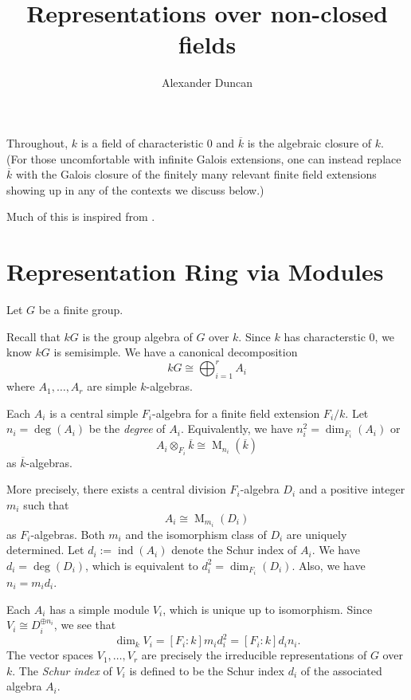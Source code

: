 \documentclass[12pt]{article}
\theoremstyle{plain}
\theoremstyle{definition}
\theoremstyle{remark}
\numberwithin{equation}{section}
\begin{document}
\title{Representations over non-closed fields}
\author{Alexander Duncan}

\maketitle

Throughout, $k$ is a field of characteristic $0$
and $\overline{k}$ is the algebraic closure of $k$.
(For those uncomfortable with infinite Galois extensions,
one can instead replace $\overline{k}$ with the Galois closure
of the finitely many relevant finite field extensions
showing up in any of the contexts we discuss below.)

Much of this is inspired from \cite[\S{12--13}]{Serre}.

\section{Representation Ring via Modules}

Let $G$ be a finite group.

Recall that $kG$ is the group algebra of $G$ over $k$.
Since $k$ has characterstic $0$, we know $kG$ is semisimple.
We have a canonical decomposition
\[
kG \cong \bigoplus_{i=1}^r A_i
\]
where $A_1,\ldots,A_r$ are simple $k$-algebras.

Each $A_i$ is a central simple $F_i$-algebra
for a finite field extension $F_i/k$.
Let $n_i = \deg(A_i)$ be the \emph{degree} of $A_i$.
Equivalently, we have $n_i^2 = \dim_{F_i}(A_i)$
or
\[
A_i \otimes_{F_i} \overline{k} \cong
\operatorname{M}_{n_i}(\overline{k})
\]
as $\overline{k}$-algebras.

More precisely, there exists a central division $F_i$-algebra $D_i$
and a positive integer $m_i$ such that
\[
A_i \cong \operatorname{M}_{m_i}(D_i)
\]
as $F_i$-algebras.
Both $m_i$ and the isomorphism class of $D_i$ are uniquely determined.
Let $d_i := \operatorname{ind}(A_i)$ denote the Schur index of $A_i$.
We have $d_i = \deg(D_i)$, which is equivalent to
$d_i^2=\dim_{F_i}(D_i)$.  Also, we have $n_i=m_id_i$.

Each $A_i$ has a simple module $V_i$, which is unique up to isomorphism.
Since $V_i \cong D_i^{\oplus n_i}$, we see that
\[
\dim_k V_i = [F_i:k]m_id_i^2 = [F_i:k]d_in_i .
\]
The vector spaces $V_1,\ldots,V_r$ are precisely the
irreducible representations of $G$ over $k$.
The \emph{Schur index} of $V_i$ is defined to be the
Schur index $d_i$ of the associated algebra $A_i$.
\end{document}
